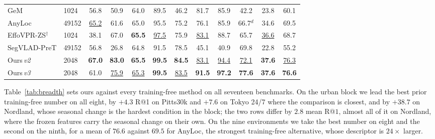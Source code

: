 \begin{table}[t]
{\begin{tabular}{ll ccccccccc|c}
GeM & 1024 & 56.8 & 50.9 & 64.0 & 89.5 & 46.2 & 81.7 & 85.9 & 42.2 & 23.8 & 60.1 \\
AnyLoc & 49152 & \underline{65.2} & 61.6 & 65.0 & 95.5 & 75.2 & 76.1 & 85.9 & 66.7$^{d}$ & 34.6 & 69.5 \\
EffoVPR-ZS$^{\dagger}$ & 1024 & 38.1 & 67.0 & \textbf{65.5} & \underline{97.5} & 75.9 & \underline{83.1} & 88.7 & 65.7 & \underline{36.6} & 68.7 \\
SegVLAD-PreT & 49152 & 56.8 & 26.8 & 64.8 & 91.5 & 78.5 & 45.1 & 40.9 & 69.8 & 22.8 & 55.2 \\
\midrule
Ours\,\emph{v2} & 2048 & \textbf{67.0} & \textbf{83.0} & \textbf{65.5} & \textbf{99.5} & \textbf{84.5} & \underline{83.1} & \underline{94.4} & \underline{72.1} & \textbf{37.6} & \underline{76.3} \\
Ours\,\emph{v3} & 2048 & 61.0 & \underline{75.9} & \underline{65.3} & \textbf{99.5} & \underline{83.5} & \textbf{91.5} & \textbf{97.2} & \textbf{77.6} & \textbf{37.6} & \textbf{76.6} \\
\bottomrule
\end{tabular}%
}
\end{table}

Table~\ref{tab:breadth} sets ours against every training-free method on all seventeen benchmarks. On the urban block we lead the best prior training-free number on all eight, by $+4.3$ R@1 on Pitts30k and $+7.6$ on Tokyo 24/7 where the comparison is closest, and by $+38.7$ on Nordland, whose seasonal change is the hardest condition in the block; the two rows differ by $2.8$ mean R@$1$, almost all of it on Nordland, where the frozen features carry the seasonal change on their own. On the nine environments we take the best number on eight and the second on the ninth, for a mean of $76.6$ against $69.5$ for AnyLoc, the strongest training-free alternative, whose descriptor is $24\times$ larger.

\label{sec:ood}

